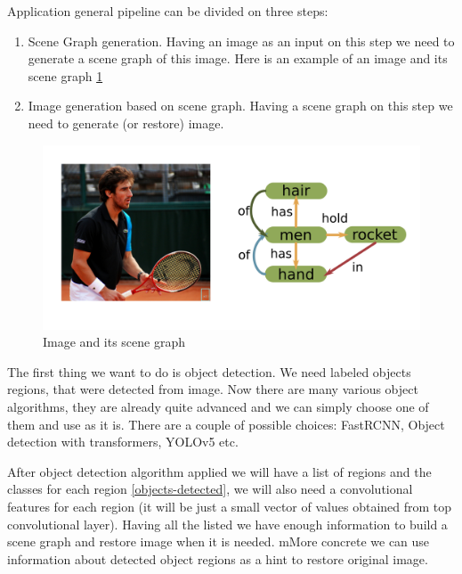 Application general pipeline can be divided on three steps:

\begin{enumerate}
    \item Scene Graph generation. Having an image as an input on this step we need to generate a scene graph of this image. Here is an example of an image and its scene graph \ref{image-and-scene-graph}
    \item Image generation based on scene graph. Having a scene graph on this step we need to generate (or restore) image.
\end{enumerate}

\begin{figure}[!h]
    \centering
    \includegraphics[width=\textwidth]{figure/image-and-scene-graph.png}
    \caption{Image and its scene graph}
    \label{image-and-scene-graph}
\end{figure}

The first thing we want to do is object detection. We need labeled objects regions, that were detected from image. Now there are many various object algorithms, they are already quite advanced and we can simply choose one of them and use as it is. There are a couple of possible choices: FastRCNN, Object detection with transformers, YOLOv5 etc.

After object detection algorithm applied we will have a list of regions and the classes for each region \ref{objects-detected}, we will also need a convolutional features for each region (it will be just a small vector of values obtained from top convolutional layer). Having all the listed we have enough information to build a scene graph and restore image when it is needed. mMore concrete we can use information about detected object regions as a hint to restore original image.

